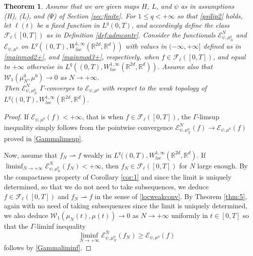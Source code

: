 \documentclass[11pt]{article}
\theoremstyle{plain}
\newtheorem{theorem}{Theorem}[section]
\theoremstyle{definition}
\theoremstyle{remark}
\numberwithin{equation}{section}
\newcommand{\R}{{\mathbb R}}
\newcommand{\wto}{\rightharpoonup}
\begin{document}
\begin{theorem}
Assume that we are given maps $H$, $L$, and $\psi$ as in assumptions (H), (L), and ($\Psi$) of Section \ref{sec:finite}. For $1\le q<+\infty$ so that \eqref{psilip2} holds, let $\ell(t)$ be a fixed function in $L^q(0,T)$, and accordingly define the class $\mathcal F_\ell([0,T])$ as in Definition \ref{def:admcontr}. Consider the functionals $\mathcal E_{\psi, \mu^0_N}^N$ and $\mathcal E_{\psi, \mu^0}$ on $L^q((0,T), W^{1,\infty}_{loc}(\R^{2d}, \R^d))$ with values in $(-\infty, +\infty]$ defined as in \eqref{mainmod2+}, and \eqref{mainmod3+}, respectively, when $f\in \mathcal F_\ell([0,T])$, and equal to $+\infty$ otherwise in $L^q((0,T), W^{1,\infty}_{loc}(\R^{2d}, \R^d))$. Assume also that $\mathcal W_1(\mu^0_N, \mu^0)\to 0$ as $N\to +\infty$. \\ Then $\mathcal E_{\psi, \mu^0_N}^N$ $\Gamma$-converges to $\mathcal E_{\psi, \mu^0}$ with respect to the weak topology of $L^q((0,T), W^{1,\infty}_{loc}(\R^{2d}, \R^d)$.
\end{theorem}
\begin{proof}
If $\mathcal E_{\psi, \mu^0}(f)<+\infty$, that is when $f\in \mathcal F_\ell([0,T])$, the $\Gamma$-limsup inequality simply follows from the pointwise convergence $\mathcal E_{\psi, \mu^0_N}^N(f)\to \mathcal E_{\psi, \mu^0}(f)$ proved in \eqref{Gammalimsup}.

Now, assume that $f_N \wto f$ weakly in $L^q((0,T), W^{1,\infty}_{loc}(\R^{2d}, \R^d)$. If $\liminf_{N\to +\infty} \mathcal E_{\psi, \mu^0_N}^N(f_N)<+\infty$, then $f_N\in \mathcal F_\ell([0,T])$ for $N$ large enough. By the compactness property of Corollary \ref{cor:1} and since the limit is uniquely determined, so that we do not need to take subsequences, we deduce $f\in \mathcal F_\ell([0,T])$ and $f_N\wto f$ in the sense of \eqref{locweakconv}. By Theorem \ref{thm:5}, again with no need of taking subsequences since the limit is uniquely determined, we also deduce $\mathcal W_1(\mu_N(t), \mu(t))\to 0$ as $N\to +\infty$ uniformly in $t\in [0,T]$ so that the $\Gamma$-liminf inequality
$$
\liminf_{N\to +\infty} \mathcal E_{\psi, \mu^0_N}^N(f_N)\ge \mathcal E_{\psi, \mu^0}(f)
$$
follows by \eqref{Gammaliminf}.
\end{proof}
\end{document}
